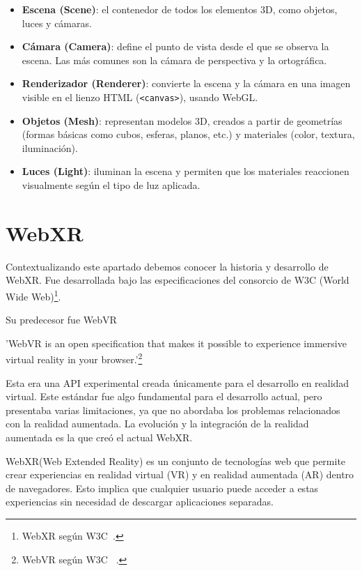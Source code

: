 \documentclass[a4paper, 12pt]{book}
\let\cleardoublepage\clearpage
\begin{document}
\begin{itemize}
    \item \textbf{Escena (Scene)}: el contenedor de todos los elementos 3D, como objetos, luces y cámaras.
    
    \item \textbf{Cámara (Camera)}: define el punto de vista desde el que se observa la escena. Las más comunes son la cámara de perspectiva y la ortográfica.
    
    \item \textbf{Renderizador (Renderer)}: convierte la escena y la cámara en una imagen visible en el lienzo HTML (\texttt{<canvas>}), usando WebGL.
    
    \item \textbf{Objetos (Mesh)}: representan modelos 3D, creados a partir de geometrías (formas básicas como cubos, esferas, planos, etc.) y materiales (color, textura, iluminación).
    
    \item \textbf{Luces (Light)}: iluminan la escena y permiten que los materiales reaccionen visualmente según el tipo de luz aplicada.
\end{itemize}


\cleardoublepage
\section{WebXR} 
\label{sec:seccion4}
Contextualizando este apartado debemos conocer la historia y desarrollo de WebXR. Fue desarrollada bajo las especificaciones del consorcio de W3C (World Wide Web)\footnote{WebXR según W3C~\cite{w3c_webxr}.}.

Su predecesor fue WebVR

'WebVR is an open specification that makes it possible to experience immersive virtual reality in your browser.'\footnote{WebVR según W3C ~\cite{webvr-spec}.} 

Esta era una API experimental creada únicamente para el desarrollo en realidad virtual. Este estándar fue algo fundamental para el desarrollo actual, pero presentaba varias limitaciones, ya que no abordaba los problemas relacionados con la realidad aumentada. La evolución y la integración de la realidad aumentada es la que creó el actual WebXR.

WebXR(Web Extended Reality) es un conjunto de tecnologías web que permite crear experiencias en realidad virtual (VR) y en realidad aumentada (AR) dentro de navegadores. Esto implica que cualquier usuario puede acceder a estas experiencias sin necesidad de descargar aplicaciones separadas.
\end{document}
